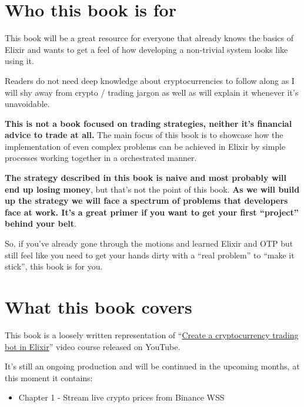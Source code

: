 \documentclass[
]{book}
\providecommand{\tightlist}{%
  \setlength{\itemsep}{0pt}\setlength{\parskip}{0pt}}
\begin{document}
\hypertarget{who-this-book-is-for}{%
\section*{Who this book is for}\label{who-this-book-is-for}}

This book will be a great resource for everyone that already knows the basics of Elixir and wants to get a feel of how developing a non-trivial system looks like using it.

Readers do not need deep knowledge about cryptocurrencies to follow along as I will shy away from crypto / trading jargon as well as will explain it whenever it's unavoidable.

\textbf{This is not a book focused on trading strategies, neither it's financial advice to trade at all.} The main focus of this book is to showcase how the implementation of even complex problems can be achieved in Elixir by simple processes working together in a orchestrated manner.

\textbf{The strategy described in this book is naive and most probably will end up losing money}, but that's not the point of this book. \textbf{As we will build up the strategy we will face a spectrum of problems that developers face at work. It's a great primer if you want to get your first ``project'' behind your belt}.

So, if you've already gone through the motions and learned Elixir and OTP but still feel like you need to get your hands dirty with a ``real problem'' to ``make it stick'', this book is for you.

\hypertarget{what-this-book-covers}{%
\section*{What this book covers}\label{what-this-book-covers}}

This book is a loosely written representation of ``\href{https://www.youtube.com/watch?v=wVYIx7M6o28\&list=PLxsE19GnjC5Nv1CbeKOiS5YqGqw35aZFJ}{Create a cryptocurrency trading bot in Elixir}'' video course released on YouTube.

It's still an ongoing production and will be continued in the upcoming months, at this moment it contains:

\begin{itemize}
\tightlist
\item
  Chapter 1 - Stream live crypto prices from Binance WSS
\end{itemize}
\end{document}
